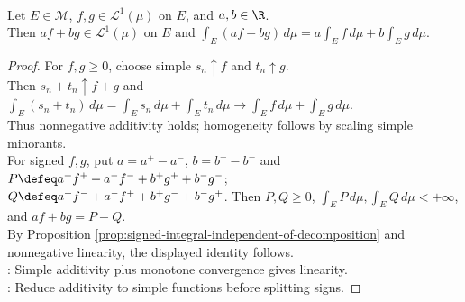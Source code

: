 \begin{proposition} \label{prop:lebesgue-integral-linearity} \\
Let $E\in\mathcal{M}$, $f,g\in\mathscr{L}^1(\mu)$ on $E$, and $a,b\in\R$.\\
Then $af+bg\in\mathscr{L}^1(\mu)$ on $E$ and $\int_E(af+bg)\,d\mu=a\int_Ef\,d\mu+b\int_Eg\,d\mu$.
\begin{proof} For $f,g\geq0$, choose simple $s_n\uparrow f$ and $t_n\uparrow g$.\\
Then $s_n+t_n\uparrow f+g$ and $\int_E(s_n+t_n)\,d\mu=\int_Es_n\,d\mu+\int_Et_n\,d\mu\to\int_Ef\,d\mu+\int_Eg\,d\mu$.\\
Thus nonnegative additivity holds; homogeneity follows by scaling simple minorants.\\
For signed $f,g$, put $a=a^+-a^-$, $b=b^+-b^-$ and $P\defeq a^+f^+ + a^-f^- + b^+g^+ + b^-g^-$;\\
$Q\defeq a^+f^- + a^-f^+ + b^+g^- + b^-g^+$. Then $P,Q\geq0$, $\int_E P\,d\mu,\int_E Q\,d\mu<+\infty$, and $af+bg=P-Q$.\\
By Proposition \ref{prop:signed-integral-independent-of-decomposition} and nonnegative linearity, the displayed identity follows.\\
: Simple additivity plus monotone convergence gives linearity.\\
: Reduce additivity to simple functions before splitting signs.
\end{proof}
\end{proposition}

